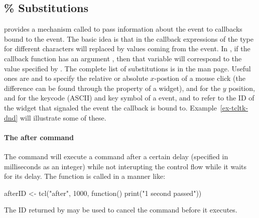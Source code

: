 \subsection{\% Substitutions}
\label{sec:tcltk-percent-substitutions}
\TK\/ provides a mechanism called  to pass
information about the event to callbacks bound to the event. The basic
idea is that in the \TCL\/ callback expressions of the type 
for different characters  will replaced by values coming from
the event. In , if the callback function has an argument
, then that variable will correspond to the value specified by
. The complete list of substitutions is in the 
man page. Useful ones are  and  to specify the
relative or absolute $x$-postion of a mouse click (the difference can
be found through the  property of a widget),  and
 for the $y$ position,  and  for the keycode
(ASCII) and key symbol of a  event, and  to
refer to the ID of the widget that signaled the event the callback is
bound to. Example~\ref{ex-tcltk-dnd} will illustrate some of these.

\paragraph{The after command}
The \TCL\/ command  will execute a command after a certain delay (specified in milliseconds as an integer) while not interupting the control flow while it waits for its delay. The function is called in a manner like:
\begin{Schunk}
  \begin{Sinput}
afterID <- tcl("after", 1000, function() print("1 second passed"))    
  \end{Sinput}
\end{Schunk}
The ID returned by  may be used to cancel the command before it executes.




